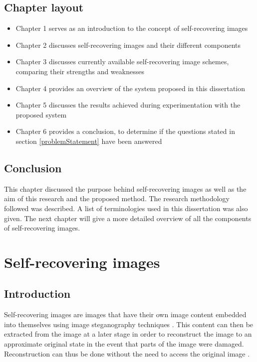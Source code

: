 \documentclass[12pt]{article}
\begin{document}
\subsection{Chapter layout}
\begin{itemize}
\item Chapter 1 serves as an introduction to the concept of self-recovering images
\item Chapter 2 discusses self-recovering images and their different components
\item Chapter 3 discusses currently available self-recovering image schemes, comparing their strengths and weaknesses
\item Chapter 4 provides an overview of the system proposed in this dissertation
\item Chapter 5 discusses the results achieved during experimentation with the proposed system
\item Chapter 6 provides a conclusion, to determine if the questions stated in section \ref{problemStatement} have been answered
\end{itemize}

\subsection{Conclusion}
This chapter discussed the purpose behind self-recovering images as well as the aim of this research and the proposed method. 
The research methodology followed was described. A list of terminologies used in this dissertation was also given.
The next chapter will give a more detailed overview of all the components of self-recovering images. 

\section{Self-recovering images}

\subsection{Introduction}
Self-recovering images are images that have their own image content embedded into themselves using image steganography techniques \cite{fridrich1999images}.
This content can then be extracted from the image at a later stage in order to reconstruct the image to an approximate original state in the event that parts of the image were damaged. Reconstruction can thus be done without the need to access the original image \cite{fridrich1999images}.
\end{document}
